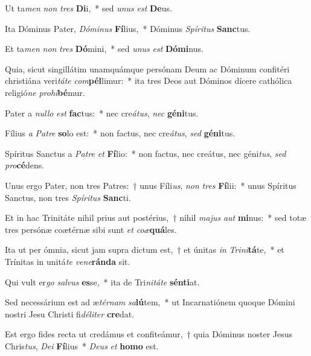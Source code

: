 \item Ut ta\textit{men} \textit{non} \textit{tres} \textbf{Di}i,~* sed \textit{u}\textit{nus} \textit{est} \textbf{De}us.
\item Ita Dóminus Pater, \textit{Dó}\textit{mi}\textit{nus} \textbf{Fí}lius,~* Dóminus \textit{Spí}\textit{ri}\textit{tus} \textbf{Sanc}tus.
\item Et ta\textit{men} \textit{non} \textit{tres} \textbf{Dó}mini,~* sed \textit{u}\textit{nus} \textit{est} \textbf{Dó}\textbf{mi}nus.
\item Quia, sicut singillátim unamquámque persónam Deum ac Dóminum confitéri christiána veri\textit{tá}\textit{te} \textit{com}\textbf{pél}limur:~* ita tres Deos aut Dóminos dícere cathólica religió\textit{ne} \textit{pro}\textit{hi}\textbf{bé}mur.
\item Pater a \textit{nul}\textit{lo} \textit{est} \textbf{fac}tus:~* nec cre\textit{á}\textit{tus}, \textit{nec} \textbf{gé}\textbf{ni}tus.
\item Fílius \textit{a} \textit{Pa}\textit{tre} \textbf{so}lo est:~* non factus, nec cre\textit{á}\textit{tus}, \textit{sed} \textbf{gé}\textbf{ni}tus.
\item Spíritus Sanctus a \textit{Pa}\textit{tre} \textit{et} \textbf{Fí}lio:~* non factus, nec creátus, nec géni\textit{tus}, \textit{sed} \textit{pro}\textbf{cé}dens.
\item Unus ergo Pater, non tres Patres:~† unus Fíli\textit{us}, \textit{non} \textit{tres} \textbf{Fí}lii:~* unus Spíritus Sanctus, non tres \textit{Spí}\textit{ri}\textit{tus} \textbf{Sanc}ti.
\item Et in hac Trinitáte nihil prius aut postérius,~† nihil \textit{ma}\textit{jus} \textit{aut} \textbf{mi}nus:~* sed totæ tres persónæ coætérnæ sibi sunt \textit{et} \textit{co}\textit{æ}\textbf{quá}les.
\item Ita ut per ómnia, sicut jam supra dictum est,~† et únitas \textit{in} \textit{Tri}\textit{ni}\textbf{tá}te,~* et Trínitas in unitá\textit{te} \textit{ve}\textit{ne}\textbf{rán}\textbf{da} sit.
\item Qui vult er\textit{go} \textit{sal}\textit{vus} \textbf{es}se,~* ita de Tri\textit{ni}\textit{tá}\textit{te} \textbf{sén}\textbf{ti}at.
\item Sed necessárium est ad æ\textit{tér}\textit{nam} \textit{sa}\textbf{lú}tem,~* ut Incarnatiónem quoque Dómini nostri Jesu Christi fi\textit{dé}\textit{li}\textit{ter} \textbf{cre}dat.
\item Est ergo fides recta ut credámus et confiteámur,~† quia Dóminus noster Jesus Chris\textit{tus}, \textit{De}\textit{i} \textbf{Fí}lius~* \textit{De}\textit{us} \textit{et} \textbf{ho}\textbf{mo} est.
